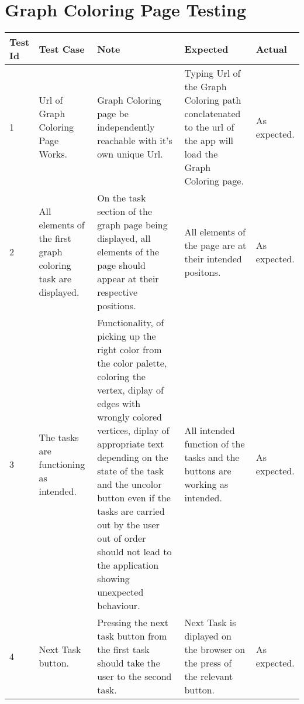\section{Graph Coloring Page Testing}
\begin{tabular}{ |p{1cm}|p{2cm}|p{4cm}|p{2cm}|p{2cm}| }
 \hline
 \textbf{Test Id} & \textbf{Test Case} & \textbf{Note} & \textbf{Expected} & \textbf{Actual} \\
 \hline
 1 
 & Url of Graph Coloring Page Works. 
 & Graph Coloring page be independently reachable with it's own unique
   Url.
 & Typing Url of the Graph Coloring path conclatenated to the url of the app will load the
   Graph Coloring page.
 & As expected. \\
 \hline
 2 
 & All elements of the first graph coloring task are displayed.
 & On the task section of the graph page being displayed, all elements of
   the page should appear at their respective positions.
 & All elements of the page are at their intended positons.
 & As expected. \\
 \hline
 3 
 & The tasks are functioning as intended. 
 & Functionality, of picking up the right color from the color palette,
   coloring the vertex, diplay of edges with wrongly colored vertices, diplay of
   appropriate text depending on the state of the task and the uncolor button
   even if the tasks are carried out by the user out of order should not lead to
   the application showing unexpected behaviour.
 & All intended function of the tasks and the buttons are working as intended. 
 & As expected. \\
 \hline
 4 
 & Next Task button.
 & Pressing the next task button from the first task
   should take the user to the second task.
 & Next Task is diplayed on the browser on the press of the relevant button.
 & As expected. \\
 \hline
\end{tabular}

